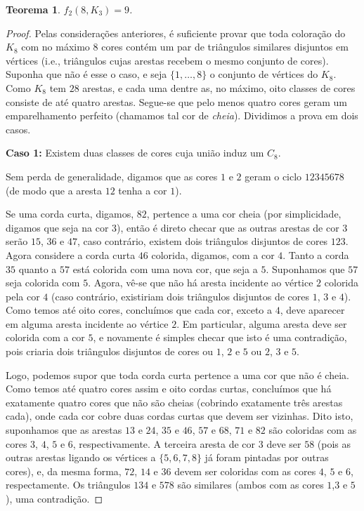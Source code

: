 \documentclass[11pt,twoside,a4paper]{book}
\newtheorem{teorema}{Teorema}[section]
\theoremstyle{note}
\begin{document}
\begin{teorema}
     $f_2(8,K_3)=9$.
\end{teorema}
\begin{proof}
Pelas considerações anteriores, é suficiente provar que toda coloração do $K_8$ com no máximo $8$ cores  contém um par de triângulos similares disjuntos em vértices (i.e., triângulos cujas arestas recebem o mesmo conjunto de cores).
Suponha que não é esse o caso, e seja $\{1,\dots,8\}$ o conjunto de vértices do $K_8$. 
Como  $K_8$ tem $28$ arestas, e cada uma dentre as, no máximo, oito classes de cores consiste de até quatro  arestas. Segue-se que pelo menos quatro cores geram um emparelhamento perfeito (chamamos tal cor de \emph{cheia}). Dividimos a prova em dois casos.

\medskip
\textbf{Caso 1:} Existem duas classes de cores cuja união induz um $C_8$. 

Sem perda de generalidade, digamos que as cores $1$ e $2$ geram o ciclo $12345678$ (de modo que a aresta $12$ tenha a cor $1$). 

Se uma corda curta, digamos, $82$, pertence a uma cor cheia (por simplicidade, digamos que seja na cor $3$), então é direto checar que as outras arestas de cor $3$ serão $15$, $36$ e $47$, caso contrário, existem dois triângulos disjuntos de cores $123$. 
Agora considere a corda curta $46$ colorida, digamos, com a cor $4$. 
Tanto a corda $35$ quanto a $57$ está colorida com uma nova cor, que seja a $5$. Suponhamos que $57$ seja colorida com $5$. 
Agora, vê-se que não há aresta incidente ao vértice $2$ colorida pela cor $4$ (caso contrário, existiriam dois triângulos disjuntos de cores $1$, $3$ e $4$). 
Como temos até oito cores, concluímos que cada cor, exceto a $4$, deve aparecer em alguma aresta incidente ao vértice $2$. 
Em particular, alguma aresta deve ser colorida com a cor $5$, e novamente é simples checar que isto é uma contradição, pois criaria dois triângulos disjuntos de cores ou $1$, $2$ e $5$ ou $2$, $3$ e $5$.

Logo, podemos supor que toda corda curta pertence a uma cor que não é cheia.
Como temos até quatro cores assim e oito cordas curtas, concluímos que há exatamente quatro cores que não são cheias (cobrindo exatamente três arestas cada), onde cada cor cobre duas cordas curtas que devem ser vizinhas. 
Dito isto, suponhamos que as arestas $13$ e $24$, $35$ e $46$, $57$ e $68$, $71$ e $82$ são coloridas com as cores $3$, $4$, $5$ e $6$, respectivamente.
A terceira aresta de cor $3$ deve ser $58$ (pois as outras arestas ligando os vértices a $\{5,6,7,8\}$ já foram pintadas por outras cores), e, da mesma forma, $72$, $14$ e $36$ devem ser coloridas com as cores $4$, $5$ e $6$, respectamente. Os triângulos $134$ e $578$ são  similares (ambos com as cores $1$,$3$ e $5$), uma contradição.


\end{proof}
\end{document}
